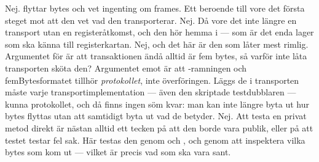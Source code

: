  Nej.  flyttar bytes och vet ingenting om frames. Ett beroende till
 vore det första steget mot att den vet vad den transporterar.
 Nej. Då vore det inte längre en transport utan en registeråtkomst, och den hör hemma i
 --- som är det enda lager som ska känna till registerkartan.
 Nej, och det här är den som låter mest rimlig. Argumentet för är att transaktionen ändå
alltid är fem bytes, så varför inte låta transporten sköta den? Argumentet emot är att
-ramningen och femBytesformatet tillhör \emph{protokollet}, inte överföringen. Läggs de
i transporten måste varje transportimplementation --- även den skriptade testdubblaren --- kunna
protokollet, och då finns ingen söm kvar: man kan inte längre byta ut hur bytes flyttas utan att
samtidigt byta ut vad de betyder.
 Nej. Att testa en privat metod direkt är nästan alltid ett tecken på att den borde vara
publik, eller på att testet testar fel sak. Här testas den genom  och
, och genom att inspektera vilka bytes som kom ut --- vilket är precis vad som
ska vara sant.
